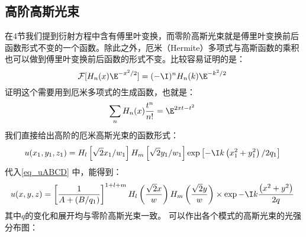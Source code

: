 \subsection{高阶高斯光束}
在4节我们提到衍射方程中含有傅里叶变换，而零阶高斯光束就是傅里叶变换前后函数形式不变的一个函数。除此之外，厄米（Hermite）多项式与高斯函数的乘积也可以做到傅里叶变换前后函数的形式不变。比较容易证明的是：
\begin{equation}
\mathcal F[H_n(x)\E^{-x^2/2}]=(-\I)^nH_n(k)\E^{-k^2/2}~
\end{equation}
证明这个需要用到厄米多项式的生成函数，也就是：
\begin{equation}
\sum_n H_n(x)\frac{t^n}{n!}=\E^{2xt-t^2}~
\end{equation}
我们直接给出高阶的厄米高斯光束的函数形式：
\begin{equation}
u(x_1,y_1,z_1)=H_l\left[\sqrt{2}x_1/w_1\right]H_m\left[\sqrt{2}y_1/w_1\right]\exp\left[-\I k\left(x_1^2+y_1^2\right)/2q_1\right]~
\end{equation}
代入\autoref{eq_uABCD} 中，能得到：
\begin{equation}
u(x,y,z)=\left[\frac{1}{A+(B/q_1)}\right]^{1+l+m}H_l\left(\frac{\sqrt{2}x}{w}\right)H_m\left(\frac{\sqrt{2}y}{w}\right)\times\exp-\I k\frac{\left(x^2+y^2\right)}{2q}~
\end{equation}
其中$q$的变化和展开均与零阶高斯光束一致。
可以作出各个模式的高斯光束的光强分布图：



